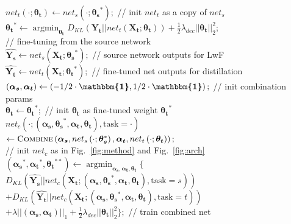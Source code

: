 \documentclass[letterpaper]{article}
\DeclareMathOperator*{\argmin}{argmin}
\begin{document}
\begin{algorithm}
\footnotesize
{}
$net_t\left(\cdot; \bm{\theta_t}\right) \gets net_s\left(\cdot; \bm{\theta_s}^*\right);$ \hfill // init $net_t$ as a copy of $net_s$\\
$\bm{\theta_t}^* \gets \argmin_{\bm{\theta_t}} D_{KL}\left(\bm{Y_t}||net_t\left(\bm{X_t}; \bm{\theta_t}\right)\right) + \frac{1}{2} \lambda_{dec} ||\bm{\theta_t}||_2^2;$\\ \hfill // fine-tuning from the source network\\
$\bm{\hat{Y_s}} \gets net_s\left(\bm{X_t}; \bm{\theta_s}^*\right);$ \hfill // source network outputs for LwF\\
$\bm{\hat{Y_t}} \gets net_t\left(\bm{X_t}; \bm{\theta_t}^*\right);$ \hfill // fine-tuned net outputs for distillation\\
$\left(\bm{\alpha_s}, \bm{\alpha_t}\right) \gets \left(-1/2\cdot\bm{\mathbbm{1}}, 1/2\cdot\bm{\mathbbm{1}}\right);$ \hfill // init combination params\\
$\bm{\theta_t} \gets \bm{\theta_t}^*;$ \hfill // init $\bm{\theta_t}$ as fine-tuned weight $\bm{\theta_t}^*$\\
$net_c\left(\cdot; \left(\bm{\alpha_s}, \bm{\theta_s}^*, \bm{\alpha_t}, \bm{\theta_t}\right), \textrm{task}=\cdot\right)$\\
\quad$\gets \textsc{Combine}\left(\bm{\alpha_s}, net_s\left(\cdot; \bm{\theta_s}^*\right), \bm{\alpha_t}, net_t\left(\cdot; \bm{\theta_t}\right)\right);$\\ \hfill // init $net_c$ as in Fig.~\ref{fig:method} and Fig.~\ref{fig:arch}\\
$\left(\bm{\alpha_s}^*, \bm{\alpha_t}^*, \bm{\theta_t}^{**}\right) \gets \argmin_{\bm{\alpha_s}, \bm{\alpha_t}, \bm{\theta_t}} \{$\\
\quad$D_{KL}(\bm{\hat{Y_s}}||net_c\left(\bm{X_t}; \left(\bm{\alpha_s}, \bm{\theta_s}^*, \bm{\alpha_t}, \bm{\theta_t}\right), \textrm{task}=s\right))$\\
\quad$+ D_{KL}(\bm{\hat{Y_t}}||net_c\left(\bm{X_t}; \left(\bm{\alpha_s}, \bm{\theta_s}^*, \bm{\alpha_t}, \bm{\theta_t}\right), \textrm{task}=t\right))$\\
\quad$+ \lambda ||\left(\bm{\alpha_s}, \bm{\alpha_t}\right)||_1 + \frac{1}{2} \lambda_{dec} ||\bm{\theta_t}||_2^2\};$ \hfill // train combined net \\
\caption{Residual Continual Learning}
\label{algorithm}
\end{algorithm}
\end{document}
